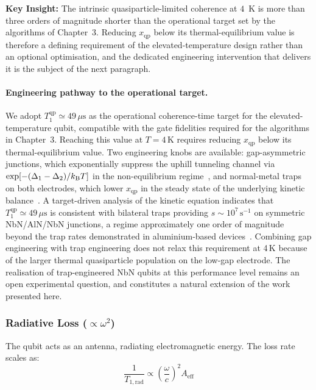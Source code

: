 \textbf{Key Insight:} The intrinsic quasiparticle-limited coherence at
$4$~K is more than three orders of magnitude shorter than the operational
target set by the algorithms of Chapter~3. Reducing $x_{\text{qp}}$
below its thermal-equilibrium value is therefore a defining requirement
of the elevated-temperature design rather than an optional optimisation,
and the dedicated engineering intervention that delivers it is the
subject of the next paragraph.

\paragraph{Engineering pathway to the operational target.}
We adopt $T_1^{\text{qp}}\simeq 49\,\mu\text{s}$ as the operational
coherence-time target for the elevated-temperature qubit, compatible with
the gate fidelities required for the algorithms in Chapter~3. Reaching this
value at $T=4\,\text{K}$ requires reducing $x_{\text{qp}}$ below its
thermal-equilibrium value. Two engineering knobs are available:
gap-asymmetric junctions, which exponentially suppress the uphill
tunneling channel via $\exp[-(\Delta_1-\Delta_2)/k_{\mathrm{B}} T]$ in the
non-equilibrium regime~\cite{Marchegiani2022}, and normal-metal traps on
both electrodes, which lower $x_{\text{qp}}$ in the steady state of the
underlying kinetic balance~\cite{Riwar2016}. A target-driven analysis of
the kinetic equation indicates that $T_1^{\text{qp}}\simeq 49\,\mu\text{s}$
is consistent with bilateral traps providing $s\sim 10^{7}\,\text{s}^{-1}$
on symmetric NbN/AlN/NbN junctions, a regime approximately one order of
magnitude beyond the trap rates demonstrated in aluminium-based
devices~\cite{Riwar2016}. Combining gap engineering with trap engineering
does not relax this requirement at 4\,K because of the larger thermal
quasiparticle population on the low-gap electrode. The realisation of
trap-engineered NbN qubits at this performance level remains an open
experimental question, and constitutes a natural extension of the work
presented here.

\subsubsection{Radiative Loss ($\propto \omega^2$)}

The qubit acts as an antenna, radiating electromagnetic energy. The loss rate scales as:
\begin{equation}
\frac{1}{T_{1,\text{rad}}} \propto \left(\frac{\omega}{c}\right)^2 A_{\text{eff}}
\label{eq:t1_radiative}
\end{equation}


